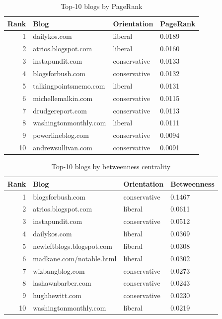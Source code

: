 \documentclass[10pt,twocolumn]{article}
\begin{document}
\begin{table}[h]
\centering
\caption{Top-10 blogs by PageRank}
\label{tab:pr}
\small
\begin{tabular}{@{}rlll@{}}
\toprule
Rank & Blog & Orientation & PageRank \\
\midrule
1 & dailykos.com & liberal & 0.0189 \\
2 & atrios.blogspot.com & liberal & 0.0160 \\
3 & instapundit.com & conservative & 0.0133 \\
4 & blogsforbush.com & conservative & 0.0132 \\
5 & talkingpointsmemo.com & liberal & 0.0131 \\
6 & michellemalkin.com & conservative & 0.0115 \\
7 & drudgereport.com & conservative & 0.0113 \\
8 & washingtonmonthly.com & liberal & 0.0111 \\
9 & powerlineblog.com & conservative & 0.0094 \\
10 & andrewsullivan.com & conservative & 0.0091 \\
\bottomrule
\end{tabular}
\end{table}

\begin{table}[h]
\centering
\caption{Top-10 blogs by betweenness centrality}
\label{tab:bc}
\small
\begin{tabular}{@{}rlll@{}}
\toprule
Rank & Blog & Orientation & Betweenness \\
\midrule
1 & blogsforbush.com & conservative & 0.1467 \\
2 & atrios.blogspot.com & liberal & 0.0611 \\
3 & instapundit.com & conservative & 0.0512 \\
4 & dailykos.com & liberal & 0.0369 \\
5 & newleftblogs.blogspot.com & liberal & 0.0308 \\
6 & madkane.com/notable.html & liberal & 0.0302 \\
7 & wizbangblog.com & conservative & 0.0273 \\
8 & lashawnbarber.com & conservative & 0.0243 \\
9 & hughhewitt.com & conservative & 0.0230 \\
10 & washingtonmonthly.com & liberal & 0.0219 \\
\bottomrule
\end{tabular}
\end{table}
\end{document}
